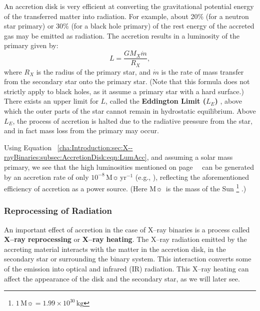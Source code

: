 \vspace{\myparskip}

An accretion disk is very efficient at converting the gravitational potential energy of the transferred matter into radiation. For example, about 20\% (for a neutron star primary) or 30\% (for a
black hole primary) of the rest energy of the accreted gas may be
emitted as radiation. The accretion results in a luminosity of the primary given by:
\begin{equation} \label{cha:Introduction:sec:X--rayBinaries:subsec:AccretionDisk:eqn:LumAcc}
L = \frac{G M_X \dot{m}}{R_X},
\end{equation}
where $R_X$ is the radius of the primary star, and $\dot{m}$ is the
rate of mass transfer from the secondary star onto the primary star. %
(Note that this formula does not strictly apply to black holes, as it assume a
primary star with a hard surface.) %
There exists an upper limit for $L$, called the \textbf{Eddington
Limit ($L_{E}$)}\label{cha:Introduction:sec:BinaryStarSystems:subsec:AccretionDisk:topic:L_E}%
, above which the outer parts of the star cannot remain in hydrostatic
equilibrium. Above $L_{E}$, the process of accretion is halted due to
the radiative pressure from the star, and in fact mass loss from the primary may occur. %

\vspace{\myparskip}

Using Equation~%
\vref{cha:Introduction:sec:X--rayBinaries:subsec:AccretionDisk:eqn:LumAcc}, %
and assuming a solar mass primary, we see
that the high luminosities mentioned on page~%
\pageref{cha:Introduction:sec:X--rayBinaries:subsec:CompactObjects:topic:HighLum}%
\ can be generated by an accretion rate of
only $10^{-8}\,\mathrm{M}\sun\,\mathrm{yr^{-1}}$ (e.g., %
%
), %
reflecting the aforementioned efficiency of accretion as a power
source. (Here $\mathrm{M}\sun$\ is the mass of the Sun%
\footnote{\label{cha:Introduction:sec:X--rayBinaries:foot:Msun}
$1\,\mathrm{M}\sun = 1.99 \times 10^{30}\,\mathrm{kg}$}%
.)


\subsubsection{Reprocessing of Radiation}\label{cha:Introduction:sec:X--rayBinaries:subsec:AccretionDisk:subsubsec:ReprocessingOfRadiation}

An important effect of accretion in the case of X--ray binaries is a
process called \textbf{X--ray reprocessing} or \textbf{X--ray heating}. The X--ray radiation emitted by the
accreting material interacts with the matter in the accretion disk, in
the secondary star or surrounding the binary system. This interaction
converts some of the emission into optical and infrared (IR) radiation. This
X--ray heating can affect the appearance of the disk and the secondary
star, as we will later see. %

